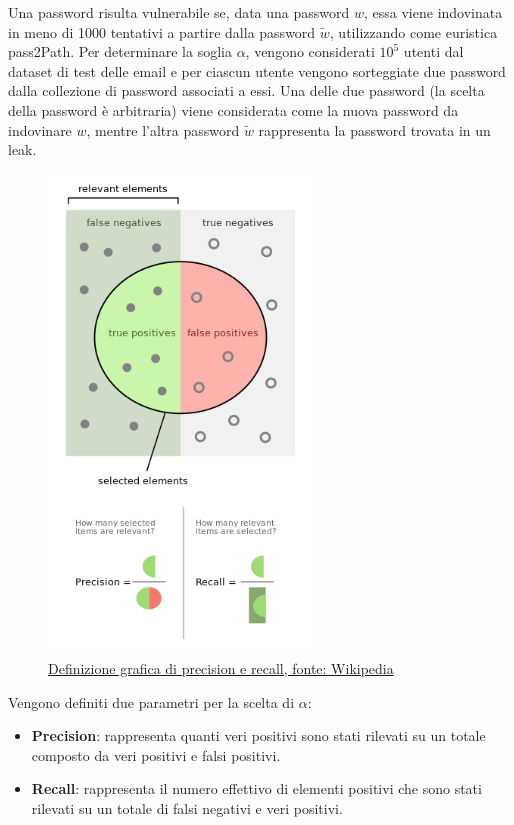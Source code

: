 Una password risulta vulnerabile se, data una password $w$, essa viene indovinata in meno di 1000 tentativi a partire dalla password $\tilde{w}$, utilizzando come euristica pass2Path.
Per determinare la soglia $\alpha$, vengono considerati $10^5$ utenti dal dataset di test delle email e per ciascun utente vengono sorteggiate due password dalla collezione di password associati a essi. Una delle due password (la scelta della password è arbitraria) viene considerata come la nuova password da indovinare $w$, mentre l'altra password $\tilde{w}$ rappresenta la password trovata in un leak.
\begin{figure}[h!]
    \centering
    \includegraphics[width=7cm]{./immagini/precisionrecall.png}
    \caption{\href{https://upload.wikimedia.org/wikipedia/commons/2/26/Precisionrecall.svg}{Definizione grafica di precision e recall, fonte: Wikipedia}}
    \label{precision recall}
\end{figure}
\FloatBarrier
Vengono definiti due parametri per la scelta di $\alpha$:
\begin{itemize}
    \item \textbf{Precision}: rappresenta quanti veri positivi sono stati rilevati su un totale composto da veri positivi e falsi positivi.
    \item \textbf{Recall}: rappresenta il numero effettivo di elementi positivi che sono stati rilevati su un totale di falsi negativi e veri positivi.
\end{itemize}
